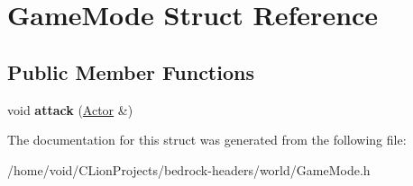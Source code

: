 \hypertarget{struct_game_mode}{}\section{Game\+Mode Struct Reference}
\label{struct_game_mode}
\subsection*{Public Member Functions}
\begin{DoxyCompactItemize}
\item 
\mbox{\label{struct_game_mode_a74f59f4ab7ede0a5f27f990bf05424cc}} 
void {\bfseries attack} (\mbox{\hyperlink{struct_actor}{Actor}} \&)
\end{DoxyCompactItemize}


The documentation for this struct was generated from the following file\+:\begin{DoxyCompactItemize}
\item 
/home/void/\+C\+Lion\+Projects/bedrock-\/headers/world/Game\+Mode.\+h\end{DoxyCompactItemize}

